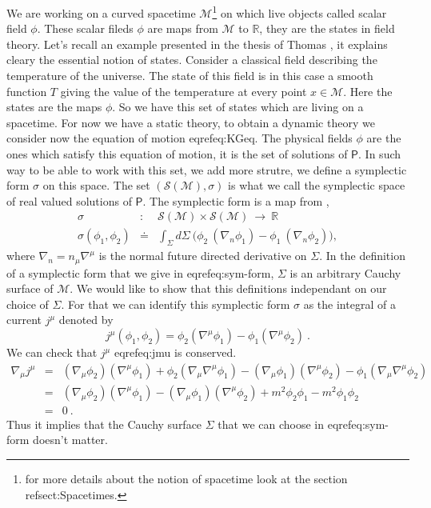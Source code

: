 \documentclass[10pt]{book}
\newcommand{\Mcal}{\mathcal{M}}
\newcommand{\Scal}{\mathcal{S}}
\newcommand{\Rbb}{\mathbb{R}}
\newcommand{\Psf}{\mathsf{P}}
\theoremstyle{break}
\begin{document}
We are working on a curved spacetime $\Mcal$\footnote{for more details about the notion of spacetime look at the section ref{sect:Spacetimes}.} 
on which live objects called scalar field $\phi$. These scalar fileds $\phi$ are maps from $\Mcal$ to $\Rbb$, they are the states in field theory. Let's recall an example presented in the thesis of Thomas %
, it explains cleary the essential notion of states. Consider a classical field describing the temperature of the universe. The state of this field is in this case a smooth function $T$ giving the value of the temperature at every point $x \in \Mcal$. Here the states are the maps $\phi$. So we have this set of states which are living on a spacetime. For now we have a static theory, to obtain a dynamic theory we consider now the equation of motion eqref{eq:KGeq}. The physical fields $\phi$ are the ones which satisfy this equation of motion, it is the set of solutions of $\Psf$. In such way to be able to work with this set, we add more strutre, we define a symplectic form $\sigma$ on this space. The set $\left(\mathcal{S}(\Mcal),\sigma\right)$ is what we call the 
symplectic space of real valued solutions of $\Psf$. The symplectic form is a map from ,
\begin{eqnarray}
 \sigma &:& \Scal(\Mcal) \times \Scal(\Mcal) \ \to \ \Rbb \nonumber \\
 \sigma(\phi_1,\phi_2) &\doteq& \int_{\Sigma} d\Sigma \ \bigg( \phi_2 \ (\nabla_n \phi_1) - \phi_1 \ (\nabla_n \phi_2) \bigg), \label{eq:sym-form}
\end{eqnarray}
where $\nabla_n = n_\mu \nabla^\mu$ is the normal future directed derivative on $\Sigma$. In the definition of a symplectic form that we give in eqref{eq:sym-form}, $\Sigma$ is an arbitrary Cauchy surface  of $\Mcal$. We would like to show that this definitions independant on our choice of $\Sigma$. For that we can identify this symplectic form $\sigma$ as the integral of a current $j^\mu$ denoted by
\begin{equation}
 j^\mu (\phi_1,\phi_2) = \phi_2 (\nabla^\mu \phi_1) - \phi_1 (\nabla^\mu \phi_2) \ . \label{eq:jmu}
\end{equation}
We can check that $j^\mu$ eqref{eq:jmu} is conserved.
\begin{eqnarray*}
 \nabla_\mu j^\mu &=& (\nabla_\mu \phi_2) (\nabla^\mu \phi_1) + \phi_2 (\nabla_\mu \nabla^\mu \phi_1) - (\nabla_\mu \phi_1) (\nabla^\mu \phi_2) - \phi_1 (\nabla_\mu \nabla^\mu \phi_2) \\
 &=& (\nabla_\mu \phi_2) (\nabla^\mu \phi_1) - (\nabla_\mu \phi_1) (\nabla^\mu \phi_2) + m^2 \phi_2 \phi_1 - m^2 \phi_1 \phi_2 \\
 &=& 0 \ .
\end{eqnarray*}
Thus it implies that the Cauchy surface $\Sigma$ that we can choose in eqref{eq:sym-form} doesn't matter. \par
\end{document}
